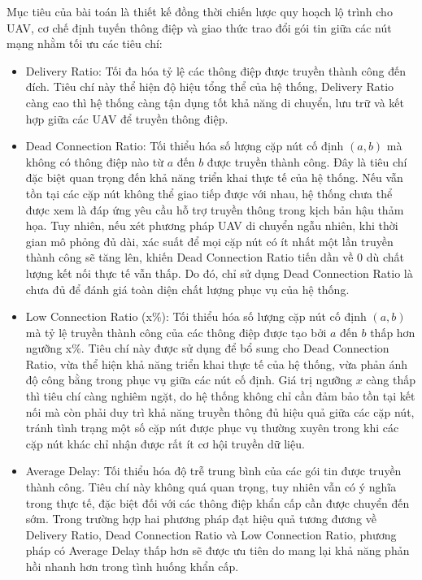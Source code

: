 \documentclass[a4paper]{article}
\begin{document}
Mục tiêu của bài toán là thiết kế đồng thời chiến lược quy hoạch lộ trình cho UAV, cơ chế định tuyến thông điệp và giao thức trao đổi gói tin giữa các nút mạng nhằm tối ưu các tiêu chí:
\begin{itemize}
\item Delivery Ratio: Tối đa hóa tỷ lệ các thông điệp được truyền thành công đến đích. Tiêu chí này thể hiện độ hiệu tổng thể của hệ thống, Delivery Ratio càng cao thì hệ thống càng tận dụng tốt khả năng di chuyển, lưu trữ và kết hợp giữa các UAV để truyền thông điệp.

\item Dead Connection Ratio: Tối thiểu hóa số lượng cặp nút cố định $(a,b)$ mà không có thông điệp nào từ $a$ đến $b$ được truyền thành công.     
Đây là tiêu chí đặc biệt quan trọng đến khả năng triển khai thực tế của hệ thống. 
Nếu vẫn tồn tại các cặp nút không thể giao tiếp được với nhau, hệ thống chưa thể được xem là đáp ứng yêu cầu hỗ trợ truyền thông trong kịch bản hậu thảm họa. 
Tuy nhiên, nếu xét phương pháp UAV di chuyển ngẫu nhiên, khi thời gian mô phỏng đủ dài, xác suất để mọi cặp nút có ít nhất một lần truyền thành công sẽ tăng lên, khiến Dead Connection Ratio tiến dần về 0 dù chất lượng kết nối thực tế vẫn thấp. 
Do đó, chỉ sử dụng Dead Connection Ratio là chưa đủ để đánh giá toàn diện chất lượng phục vụ của hệ thống.

\item Low Connection Ratio (x\%): Tối thiểu hóa số lượng cặp nút cố định $(a,b)$ mà tỷ lệ truyền thành công của các thông điệp được tạo bởi $a$ đến $b$ thấp hơn ngưỡng x\%. 
Tiêu chí này được sử dụng để bổ sung cho Dead Connection Ratio, vừa thể hiện khả năng triển khai thực tế của hệ thống, vừa phản ánh độ công bằng trong phục vụ giữa các nút cố định.
Giá trị ngưỡng $x$ càng thấp thì tiêu chí càng nghiêm ngặt, do hệ thống không chỉ cần đảm bảo tồn tại kết nối mà còn phải duy trì khả năng truyền thông đủ hiệu quả giữa các cặp nút, tránh tình trạng một số cặp nút được phục vụ thường xuyên trong khi các cặp nút khác chỉ nhận được rất ít cơ hội truyền dữ liệu.

\item Average Delay: Tối thiểu hóa độ trễ trung bình của các gói tin được truyền thành công.
Tiêu chí này không quá quan trọng, tuy nhiên vẫn có ý nghĩa trong thực tế, đặc biệt đối với các thông điệp khẩn cấp cần được chuyển đến sớm. 
Trong trường hợp hai phương pháp đạt hiệu quả tương đương về Delivery Ratio, Dead Connection Ratio và Low Connection Ratio, phương pháp có Average Delay thấp hơn sẽ được ưu tiên do mang lại khả năng phản hồi nhanh hơn trong tình huống khẩn cấp.
\end{itemize}
\end{document}

